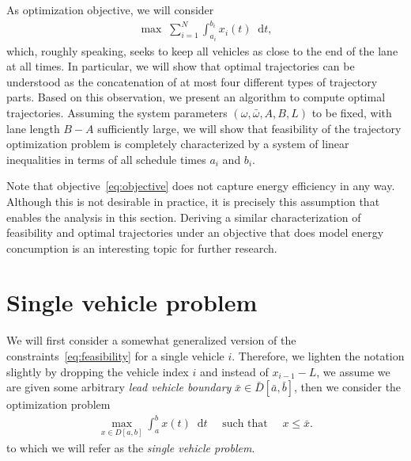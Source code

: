 \documentclass[a4paper]{article}
\theoremstyle{definition}
\theoremstyle{plain}
\newcommand*\diff{\mathop{}\!\mathrm{d}}
\begin{document}
As optimization objective, we will consider
\begin{align}\label{eq:objective}
  \max \; \sum_{i=1}^{N} \int_{a_{i}}^{b_{i}} x_{i}(t) \diff t ,
\end{align}
which, roughly speaking, seeks to keep all vehicles as close to the end of the
lane at all times.
%
In particular, we will show that optimal trajectories can be understood as the
concatenation of at most four different types of trajectory parts. Based on this
observation, we present an algorithm to compute optimal trajectories.
%
Assuming the system parameters $(\omega, \bar{\omega},A,B,L)$ to be fixed, with lane
length $B-A$ sufficiently large, we will show that feasibility of the trajectory
optimization problem is completely characterized by a system of linear
inequalities in terms of all schedule times $a_{i}$ and $b_{i}$.

Note that objective~\eqref{eq:objective} does not capture energy efficiency in
any way. Although this is not desirable in practice, it is precisely this
assumption that enables the analysis in this section. Deriving a similar
characterization of feasibility and optimal trajectories under an objective that
does model energy concumption is an interesting topic for further research.



\section{Single vehicle problem}

We will first consider a somewhat generalized version of the constraints~\eqref{eq:feasibility} for
a single vehicle $i$. Therefore, we lighten the notation slightly by dropping
the vehicle index $i$ and instead of $x_{i-1} - L$, we assume we are given some
arbitrary \emph{lead vehicle boundary} $\bar{x} \in \bar{D}[\bar{a}, \bar{b}]$, then we
consider the optimization problem
\begin{align}
  \max_{x \in D[a, b]} \int_{a}^{b} x(t) \diff t \quad \text{ such that } \quad x \leq \bar{x} .
\end{align}
to which we will refer as the \emph{single vehicle problem}.
\end{document}
